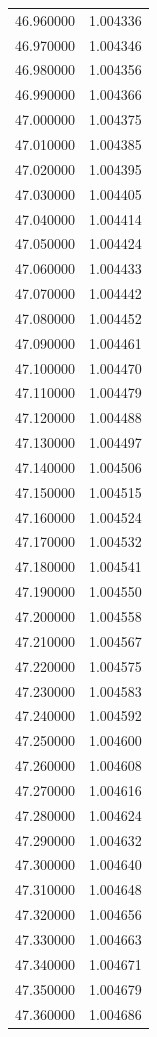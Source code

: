 \begin{tabular}{rr}
46.960000 & 1.004336 \\
46.970000 & 1.004346 \\
46.980000 & 1.004356 \\
46.990000 & 1.004366 \\
47.000000 & 1.004375 \\
47.010000 & 1.004385 \\
47.020000 & 1.004395 \\
47.030000 & 1.004405 \\
47.040000 & 1.004414 \\
47.050000 & 1.004424 \\
47.060000 & 1.004433 \\
47.070000 & 1.004442 \\
47.080000 & 1.004452 \\
47.090000 & 1.004461 \\
47.100000 & 1.004470 \\
47.110000 & 1.004479 \\
47.120000 & 1.004488 \\
47.130000 & 1.004497 \\
47.140000 & 1.004506 \\
47.150000 & 1.004515 \\
47.160000 & 1.004524 \\
47.170000 & 1.004532 \\
47.180000 & 1.004541 \\
47.190000 & 1.004550 \\
47.200000 & 1.004558 \\
47.210000 & 1.004567 \\
47.220000 & 1.004575 \\
47.230000 & 1.004583 \\
47.240000 & 1.004592 \\
47.250000 & 1.004600 \\
47.260000 & 1.004608 \\
47.270000 & 1.004616 \\
47.280000 & 1.004624 \\
47.290000 & 1.004632 \\
47.300000 & 1.004640 \\
47.310000 & 1.004648 \\
47.320000 & 1.004656 \\
47.330000 & 1.004663 \\
47.340000 & 1.004671 \\
47.350000 & 1.004679 \\
47.360000 & 1.004686 \\

\end{tabular}
